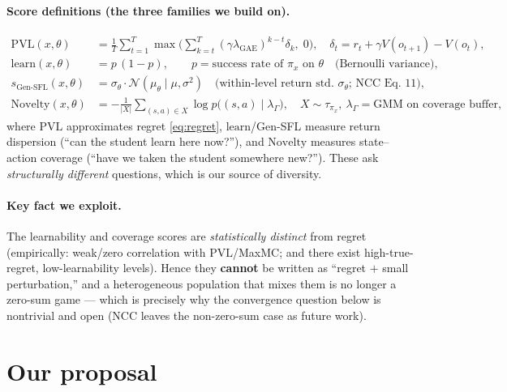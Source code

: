 \documentclass[11pt]{article}
\newcommand{\level}{\theta}        %
\newcommand{\policy}{\pi}
\newcommand{\param}{x}             %
\newcommand{\pvl}{\mathrm{PVL}}
\begin{document}
\paragraph{Score definitions (the three families we build on).}
\begin{align}
  \pvl(\param,\level) &= \frac{1}{T}\sum_{t=1}^{T}\max\!\Big(\textstyle\sum_{k=t}^{T}(\gamma\lambda_{\mathrm{GAE}})^{k-t}\delta_k,\;0\Big),
    \quad \delta_t = r_t+\gamma V(o_{t+1})-V(o_t),
    \label{eq:pvl}\\[2pt]
  \mathrm{learn}(\param,\level) &= p\,(1-p), \qquad p=\text{success rate of }\policy_\param\text{ on }\level
    \quad\text{(Bernoulli variance)},
    \label{eq:learn}\\[2pt]
  s_{\mathrm{Gen\text{-}SFL}}(\param,\level) &= \sigma_{\level}\cdot \mathcal{N}(\mu_{\level}\mid \mu,\sigma^2)
    \quad\text{(within-level return std.\ }\sigma_\level\text{; NCC Eq.~11)},
    \label{eq:genlearn}\\[2pt]
  \mathrm{Novelty}(\param,\level) &= -\frac{1}{|X|}\sum_{(s,a)\in X}\log p\big((s,a)\mid \lambda_\Gamma\big),
    \quad X\sim\tau_{\policy_\param},\ \lambda_\Gamma=\text{GMM on coverage buffer},
    \label{eq:cenie}
\end{align}
where $\pvl$ approximates regret \eqref{eq:regret}, $\mathrm{learn}$/Gen-SFL measure return dispersion (``can the student learn here now?''), and $\mathrm{Novelty}$ measures state--action coverage (``have we taken the student somewhere new?''). These ask \emph{structurally different} questions, which is our source of diversity.

\paragraph{Key fact we exploit.}
The learnability and coverage scores are \emph{statistically distinct} from regret (empirically: weak/zero correlation with $\pvl$/MaxMC; and there exist high-true-regret, low-learnability levels). Hence they \textbf{cannot} be written as ``regret $+$ small perturbation,'' and a heterogeneous population that mixes them is no longer a zero-sum game --- which is precisely why the convergence question below is nontrivial and open (NCC leaves the non-zero-sum case as future work).

\section{Our proposal}
\label{sec:proposal}
\end{document}
